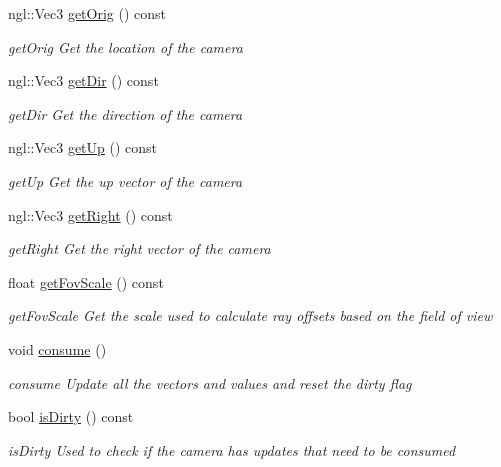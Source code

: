 \begin{DoxyCompactItemize}
ngl\-::\-Vec3 \hyperlink{classCamera_a609beb780b3bb52a4b94ec19ca831a9b}{get\-Orig} () const 
\begin{DoxyCompactList}\small\item\em get\-Orig Get the location of the camera \end{DoxyCompactList}\item 
ngl\-::\-Vec3 \hyperlink{classCamera_a2ccd198eae7f90000f53422b760876e0}{get\-Dir} () const 
\begin{DoxyCompactList}\small\item\em get\-Dir Get the direction of the camera \end{DoxyCompactList}\item 
ngl\-::\-Vec3 \hyperlink{classCamera_a375c97c35eb25d7839d85361d1858c3f}{get\-Up} () const 
\begin{DoxyCompactList}\small\item\em get\-Up Get the up vector of the camera \end{DoxyCompactList}\item 
ngl\-::\-Vec3 \hyperlink{classCamera_a19c7285d6919678bc1b11206bfe895fb}{get\-Right} () const 
\begin{DoxyCompactList}\small\item\em get\-Right Get the right vector of the camera \end{DoxyCompactList}\item 
float \hyperlink{classCamera_add207b5f24a14de6bfefb4425f200e15}{get\-Fov\-Scale} () const 
\begin{DoxyCompactList}\small\item\em get\-Fov\-Scale Get the scale used to calculate ray offsets based on the field of view \end{DoxyCompactList}\item 
\hypertarget{classCamera_a2da4f15a13acdc03870b0dca36de7986}{void \hyperlink{classCamera_a2da4f15a13acdc03870b0dca36de7986}{consume} ()}\label{classCamera_a2da4f15a13acdc03870b0dca36de7986}

\begin{DoxyCompactList}\small\item\em consume Update all the vectors and values and reset the dirty flag \end{DoxyCompactList}\item 
bool \hyperlink{classCamera_afd2d3859c75b0f8fa7288a4b70527bf3}{is\-Dirty} () const 
\begin{DoxyCompactList}\small\item\em is\-Dirty Used to check if the camera has updates that need to be consumed \end{DoxyCompactList}\end{DoxyCompactItemize}


